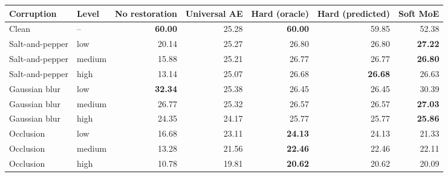 \begin{tabular}{llrrrrr}
\toprule
Corruption & Level & No restoration & Universal AE & Hard (oracle) & Hard (predicted) & Soft MoE \\
\midrule
Clean & -- & \textbf{60.00} & 25.28 & \textbf{60.00} & 59.85 & 52.38 \\
Salt-and-pepper & low & 20.14 & 25.27 & 26.80 & 26.80 & \textbf{27.22} \\
Salt-and-pepper & medium & 15.88 & 25.21 & 26.77 & 26.77 & \textbf{26.80} \\
Salt-and-pepper & high & 13.14 & 25.07 & 26.68 & \textbf{26.68} & 26.63 \\
Gaussian blur & low & \textbf{32.34} & 25.38 & 26.45 & 26.45 & 30.39 \\
Gaussian blur & medium & 26.77 & 25.32 & 26.57 & 26.57 & \textbf{27.03} \\
Gaussian blur & high & 24.35 & 24.17 & 25.77 & 25.77 & \textbf{25.86} \\
Occlusion & low & 16.68 & 23.11 & \textbf{24.13} & 24.13 & 21.33 \\
Occlusion & medium & 13.28 & 21.56 & \textbf{22.46} & 22.46 & 22.11 \\
Occlusion & high & 10.78 & 19.81 & \textbf{20.62} & 20.62 & 20.09 \\
\bottomrule
\end{tabular}
